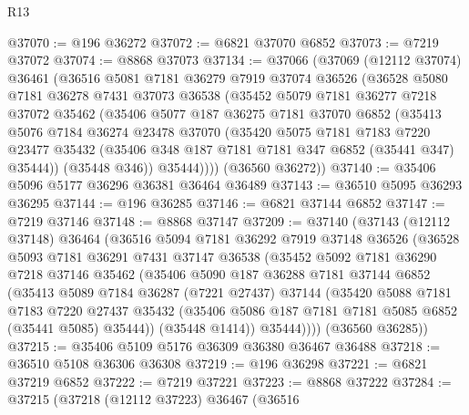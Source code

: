 \begin{lexlean}{R13}
\begin{coremodule}
@37070 := @196 @36272
@37072 := @6821 @37070 @6852
@37073 := @7219 @37072
@37074 := @8868 @37073
@37134 := @37066
    (@37069
      (@12112 @37074)
      @36461
      (@36516
        @5081
        @7181
        @36279
        @7919
        @37074
        @36526
        (@36528
          @5080
          @7181
          @36278
          @7431
          @37073
          @36538
          (@35452
            @5079
            @7181
            @36277
            @7218
            @37072
            @35462
            (@35406
              @5077
              @187
              @36275
              @7181
              @37070
              @6852
              (@35413
                @5076
                @7184
                @36274
                @23478
                @37070
                (@35420
                  @5075
                  @7181
                  @7183
                  @7220
                  @23477
                  @35432
                  (@35406 @348 @187 @7181 @7181 @347 @6852 (@35441 @347) @35444))
                (@35448 @346))
              @35444))))
      (@36560 @36272))
@37140 := @35406 @5096 @5177 @36296 @36381 @36464 @36489
@37143 := @36510 @5095 @36293 @36295
@37144 := @196 @36285
@37146 := @6821 @37144 @6852
@37147 := @7219 @37146
@37148 := @8868 @37147
@37209 := @37140
    (@37143
      (@12112 @37148)
      @36464
      (@36516
        @5094
        @7181
        @36292
        @7919
        @37148
        @36526
        (@36528
          @5093
          @7181
          @36291
          @7431
          @37147
          @36538
          (@35452
            @5092
            @7181
            @36290
            @7218
            @37146
            @35462
            (@35406
              @5090
              @187
              @36288
              @7181
              @37144
              @6852
              (@35413
                @5089
                @7184
                @36287
                (@7221 @27437)
                @37144
                (@35420
                  @5088
                  @7181
                  @7183
                  @7220
                  @27437
                  @35432
                  (@35406 @5086 @187 @7181 @7181 @5085 @6852 (@35441 @5085) @35444))
                (@35448 @1414))
              @35444))))
      (@36560 @36285))
@37215 := @35406 @5109 @5176 @36309 @36380 @36467 @36488
@37218 := @36510 @5108 @36306 @36308
@37219 := @196 @36298
@37221 := @6821 @37219 @6852
@37222 := @7219 @37221
@37223 := @8868 @37222
@37284 := @37215
    (@37218
      (@12112 @37223)
      @36467
      (@36516

\end{coremodule}
\end{lexlean}
